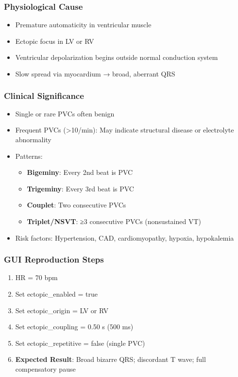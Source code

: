 \documentclass[11pt, a4paper]{article}
\begin{document}
\subsubsection{Physiological Cause}
\begin{itemize}
    \item Premature automaticity in ventricular muscle
    \item Ectopic focus in LV or RV
    \item Ventricular depolarization begins outside normal conduction system
    \item Slow spread via myocardium → broad, aberrant QRS
\end{itemize}

\subsubsection{Clinical Significance}
\begin{itemize}
    \item Single or rare PVCs often benign
    \item Frequent PVCs (>10/min): May indicate structural disease or electrolyte abnormality
    \item Patterns:
    \begin{itemize}
        \item \textbf{Bigeminy}: Every 2nd beat is PVC
        \item \textbf{Trigeminy}: Every 3rd beat is PVC
        \item \textbf{Couplet}: Two consecutive PVCs
        \item \textbf{Triplet/NSVT}: ≥3 consecutive PVCs (nonsustained VT)
    \end{itemize}
    \item Risk factors: Hypertension, CAD, cardiomyopathy, hypoxia, hypokalemia
\end{itemize}

\subsubsection{GUI Reproduction Steps}
\begin{enumerate}
    \item HR = 70 bpm
    \item Set ectopic\_enabled = true
    \item Set ectopic\_origin = LV or RV
    \item Set ectopic\_coupling = 0.50 s (500 ms)
    \item Set ectopic\_repetitive = false (single PVC)
    \item \textbf{Expected Result}: Broad bizarre QRS; discordant T wave; full compensatory pause
\end{enumerate}
\end{document}
